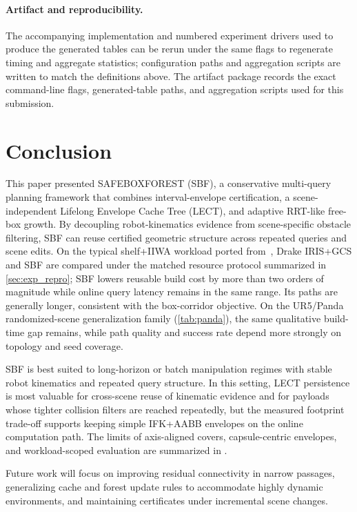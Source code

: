 \documentclass[journal]{IEEEtran}
\DeclareRobustCommand{\textsc}[1]{\textnormal{\MakeUppercase{#1}}}
\newcommand{\sbf}{\textsc{SBF}}
\begin{document}
\paragraph{Artifact and reproducibility.}
The accompanying implementation and numbered experiment drivers used to produce
the generated tables can be rerun under the same flags to regenerate timing and
aggregate statistics; configuration paths and aggregation scripts are written to
match the definitions above. The artifact package records the exact command-line
flags, generated-table paths, and aggregation scripts used for this submission.

\section{Conclusion}\label{sec:conclusion}

This paper presented \textsc{SafeBoxForest} (\sbf{}), a conservative
multi-query planning framework that combines interval-envelope certification,
a scene-independent Lifelong Envelope Cache Tree (LECT), and adaptive RRT-like
free-box growth. By decoupling robot-kinematics evidence from scene-specific
obstacle filtering, SBF can reuse certified geometric structure across repeated
queries and scene edits. On the typical shelf+IIWA workload ported
from~\cite{marcucci2023motion}, Drake IRIS+GCS and SBF are compared under the
matched resource protocol summarized in \cref{sec:exp_repro}; SBF lowers
reusable build cost by more than two orders of magnitude while online query
latency remains in the same range. Its paths are generally longer, consistent
with the box-corridor objective. On the UR5/Panda randomized-scene
generalization family (\cref{tab:panda}), the same qualitative build-time gap
remains, while path quality and success rate depend more strongly on topology
and seed coverage.

\sbf{} is best suited to long-horizon or batch manipulation regimes with stable
robot kinematics and repeated query structure. In this setting, LECT
persistence is most valuable for cross-scene reuse of kinematic evidence and
for payloads whose tighter collision filters are reached repeatedly, but the
measured footprint trade-off supports keeping simple IFK+AABB envelopes on the
online computation path. The limits of
axis-aligned covers, capsule-centric envelopes,
and workload-scoped evaluation are summarized in .

Future work will focus on improving residual connectivity in narrow passages, generalizing
cache and forest update rules to accommodate highly dynamic environments, and maintaining
certificates under incremental scene changes.



\end{document}
